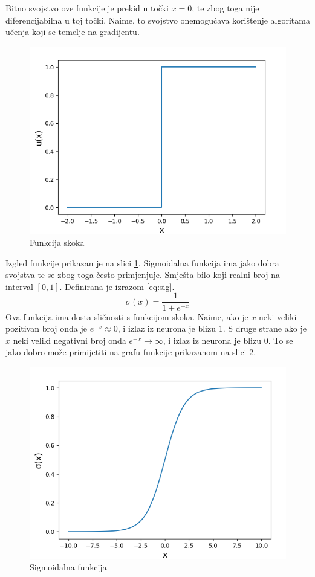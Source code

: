 \documentclass[times, utf8, zavrsni, numeric]{fer}
\begin{document}
Bitno svojstvo ove funkcije je prekid u točki $x=0$, te zbog toga nije 
diferencijabilna u toj točki. Naime, to svojstvo onemogućava korištenje 
algoritama učenja koji se temelje na gradijentu. 
\begin{figure}[htb]
	\centering
	\includegraphics[scale=0.35]{step_fun.png}
	\caption{Funkcija skoka}
	\label{fig:step_fun}
\end{figure}
Izgled funkcije prikazan je na slici 
\ref{fig:step_fun}.
\newpage
Sigmoidalna funkcija ima jako dobra svojstva te se zbog toga često primjenjuje.
Smješta bilo koji realni broj na interval $[0, 1]$. Definirana je izrazom 
\ref{eq:sig}.
\begin{equation}
	\sigma(x)=\frac{1}{1+e^{-x}}
	\label{eq:sig}
\end{equation}
Ova funkcija ima dosta sličnosti s funkcijom skoka. Naime, ako je $x$ neki 
veliki pozitivan broj onda je $e^{-x} \approx 0$, i izlaz iz neurona je blizu
1. S druge strane ako je $x$ neki veliki negativni broj onda $e^{-x} \to 
\infty$, i izlaz iz neurona je blizu 0. To se jako dobro može primijetiti na
grafu funkcije prikazanom na slici \ref{fig:sig_fun}.
\begin{figure}[htb]
	\centering
	\includegraphics[scale=0.35]{sig_fun.png}
	\caption{Sigmoidalna funkcija}
	\label{fig:sig_fun}
\end{figure}
\end{document}
